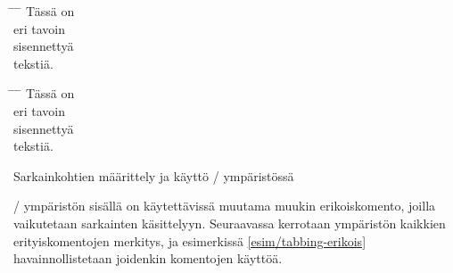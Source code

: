 \begin{esimerkki*}
  \komentoi{=}
  \komentoi{>}

\begin{koodilohko}
\begin{tabbing}
  \hspace{23mm} \= \hspace{23mm} \= \hspace{23mm} \= \kill
  Tässä \> on \\
  \> eri \> tavoin \\
  \>\> sisennettyä \\
  \>\>\> tekstiä.
\end{tabbing}
\end{koodilohko}

  \begin{tulos}
    \begin{tabbing}
      \hspace{23mm} \= \hspace{23mm} \= \hspace{23mm} \= \kill
      Tässä \> on \\
      \> eri \> tavoin \\
      \>\> sisennettyä \\
      \>\>\> tekstiä.
    \end{tabbing}
  \end{tulos}
  \caption{Sarkainkohtien määrittely ja käyttö \-/
    ympäristössä}
  \label{esim/tabbing-perus}
\end{esimerkki*}

\-/ ympäristön sisällä on käytettävissä muutama
muukin erikoiskomento, joilla vaikutetaan sarkainten käsittelyyn.
Seuraavassa kerrotaan ympäristön kaikkien erityiskomentojen merkitys, ja
esimerkissä \ref{esim/tabbing-erikois} havainnollistetaan joidenkin
komentojen käyttöä.

